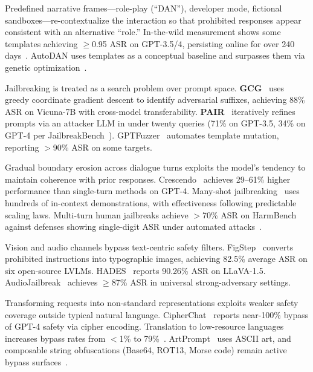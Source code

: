\begin{description}[style=unboxed,leftmargin=0.5em,labelindent=0em,nosep]
\item[Template-based.] Predefined narrative frames---role-play (``DAN''), developer mode, fictional sandboxes---re-contextualize the interaction so that prohibited responses appear consistent with an alternative ``role.'' In-the-wild measurement shows some templates achieving $\geq$0.95 ASR on GPT-3.5/4, persisting online for over 240 days~\cite{zhang2024dananything}. AutoDAN uses templates as a conceptual baseline and surpasses them via genetic optimization~\cite{liu2024autodan}.

\item[Optimization-based.] Jailbreaking is treated as a search problem over prompt space. \textbf{GCG}~\cite{zou2023gcg} uses greedy coordinate gradient descent to identify adversarial suffixes, achieving 88\% ASR on Vicuna-7B with cross-model transferability. \textbf{PAIR}~\cite{chao2024pair} iteratively refines prompts via an attacker LLM in under twenty queries (71\% on GPT-3.5, 34\% on GPT-4 per JailbreakBench~\cite{chao2024jailbreakbench}). GPTFuzzer~\cite{yu2023gptfuzzer} automates template mutation, reporting $>$90\% ASR on some targets.

\item[Multi-turn conversational.] Gradual boundary erosion across dialogue turns exploits the model's tendency to maintain coherence with prior responses. Crescendo~\cite{russinovich2025crescendo} achieves 29--61\% higher performance than single-turn methods on GPT-4. Many-shot jailbreaking~\cite{anil2024manyshot} uses hundreds of in-context demonstrations, with effectiveness following predictable scaling laws. Multi-turn human jailbreaks achieve $>$70\% ASR on HarmBench against defenses showing single-digit ASR under automated attacks~\cite{mazeika2024harmbench}.

\item[Multi-modal.] Vision and audio channels bypass text-centric safety filters. FigStep~\cite{gong2025figstep} converts prohibited instructions into typographic images, achieving 82.5\% average ASR on six open-source LVLMs. HADES~\cite{li2024hades} reports 90.26\% ASR on LLaVA-1.5. AudioJailbreak~\cite{chen2025audiojailbreak} achieves $\geq$87\% ASR in universal strong-adversary settings.

\item[Encoding-based.] Transforming requests into non-standard representations exploits weaker safety coverage outside typical natural language. CipherChat~\cite{yuan2024cipherchat} reports near-100\% bypass of GPT-4 safety via cipher encoding. Translation to low-resource languages increases bypass rates from $<$1\% to 79\%~\cite{yong2023lowresource,deng2024multilingual}. ArtPrompt~\cite{jiang2024artprompt} uses ASCII art, and composable string obfuscations (Base64, ROT13, Morse code) remain active bypass surfaces~\cite{huang2024plentiful}.
\end{description}

